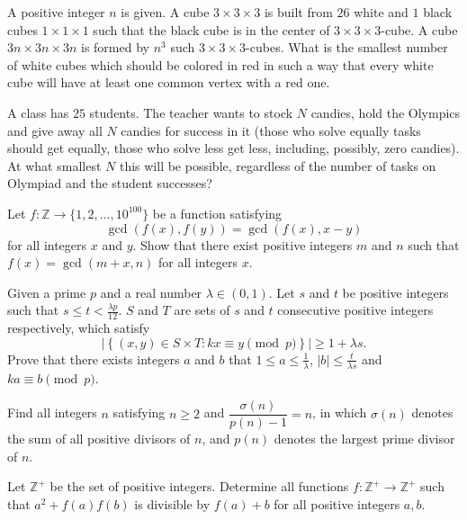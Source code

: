 \documentclass[11pt]{scrartcl}
\begin{document}
\begin{problem}[457934969594281]
	A positive integer $n$ is given. A cube $3\times3\times3$ is built from $26$ white and $1$ black cubes $1\times1\times1$ such that the black cube is in the center of $3\times3\times3$-cube. A cube $3n\times 3n\times 3n$ is formed by $n^3$ such $3\times3\times3$-cubes. What is the smallest number of white cubes which should be colored in red in such a way that every white cube will have at least one common vertex with a red one.
\end{problem}
\begin{problem}[458902414604417]
	A class has $25$ students. The teacher wants to stock $N$ candies, hold the Olympics and give away all $N$ candies for success in it (those who solve equally tasks should get equally, those who solve less get less, including, possibly, zero candies). At what smallest $N$ this will be possible, regardless of the number of tasks on Olympiad and the student successes?
\end{problem}
\begin{problem}[461803484803557]
	Let $f: \mathbb Z\to \{1, 2, \dots, 10^{100}\}$ be a function satisfying
$$\gcd(f(x), f(y)) = \gcd(f(x), x-y)$$for all integers $x$ and $y$. Show that there exist positive integers $m$ and $n$ such that $f(x) = \gcd(m+x, n)$ for all integers $x$.
\end{problem}
\begin{problem}[464655624752463]
Given a prime $p$ and a real number $\lambda \in (0,1)$. Let $s$ and $t$ be positive integers such that $s \leqslant t < \frac{\lambda p}{12}$. $S$ and $T$ are sets of $s$ and $t$ consecutive positive integers respectively, which satisfy$$\left| \left\{ (x,y) \in S \times T : kx \equiv y \pmod p \right\}\right| \geqslant 1 + \lambda s.$$Prove that there exists integers $a$ and $b$ that $1 \leqslant a \leqslant \frac{1}{ \lambda}$, $\left| b \right| \leqslant \frac{t}{\lambda s}$ and $ka \equiv b \pmod p$.
\end{problem}
\begin{problem}[466409818083772]
Find all integers $n$ satisfying $n \geq 2$ and $\dfrac{\sigma(n)}{p(n)-1} = n$, in which $\sigma(n)$ denotes the sum of all positive divisors of $n$, and $p(n)$ denotes the largest prime divisor of $n$.
\end{problem}
\begin{problem}[467342110469005]
Let $\mathbb{Z}^+$ be the set of positive integers. Determine all functions $f : \mathbb{Z}^+\to\mathbb{Z}^+$ such that $a^2+f(a)f(b)$ is divisible by $f(a)+b$ for all positive integers $a,b$.
\end{problem}
\end{document}
